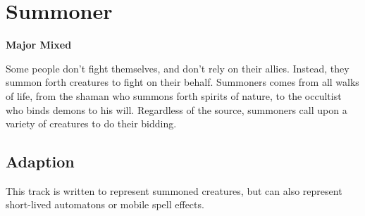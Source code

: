 \section{Summoner}
\textbf{Major Mixed}

Some people don't fight themselves, and don't rely on their allies. Instead, they summon forth creatures to fight on their behalf. Summoners comes from all walks of life, from the shaman who summons forth spirits of nature, to the occultist who binds demons to his will. Regardless of the source, summoners call upon a variety of creatures to do their bidding.
\subsection*{Adaption}
This track is written to represent summoned creatures, but can also represent short-lived automatons or mobile spell effects.

